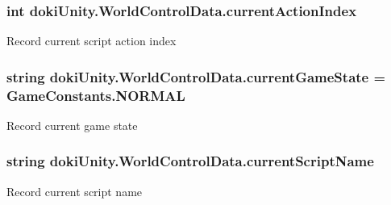 \subsubsection[{\texorpdfstring{current\+Action\+Index}{currentActionIndex}}]{\setlength{\rightskip}{0pt plus 5cm}int doki\+Unity.\+World\+Control\+Data.\+current\+Action\+Index}\hypertarget{classdoki_unity_1_1_world_control_data_ae134b545efc5faa2da90e10e381dcfcc}{}\label{classdoki_unity_1_1_world_control_data_ae134b545efc5faa2da90e10e381dcfcc}


Record current script action index 

\subsubsection[{\texorpdfstring{current\+Game\+State}{currentGameState}}]{\setlength{\rightskip}{0pt plus 5cm}string doki\+Unity.\+World\+Control\+Data.\+current\+Game\+State = Game\+Constants.\+N\+O\+R\+M\+AL}\hypertarget{classdoki_unity_1_1_world_control_data_aaa9ed37dc517186250f972d7604f771c}{}\label{classdoki_unity_1_1_world_control_data_aaa9ed37dc517186250f972d7604f771c}


Record current game state 

\subsubsection[{\texorpdfstring{current\+Script\+Name}{currentScriptName}}]{\setlength{\rightskip}{0pt plus 5cm}string doki\+Unity.\+World\+Control\+Data.\+current\+Script\+Name}\hypertarget{classdoki_unity_1_1_world_control_data_a58596f3ce00cf0090848847a652768ec}{}\label{classdoki_unity_1_1_world_control_data_a58596f3ce00cf0090848847a652768ec}


Record current script name 

